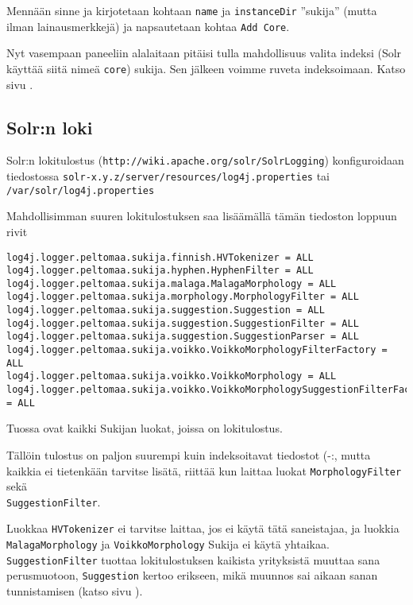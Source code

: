 \documentclass[12pt,a4paper]{scrartcl}
\begin{document}
Mennään sinne ja kirjotetaan kohtaan \verb=name= ja \verb=instanceDir=
''sukija'' (mutta ilman lainausmerkkejä) ja napsautetaan kohtaa
\verb=Add Core=.

Nyt vasempaan paneeliin alalaitaan pitäisi tulla mahdollisuus valita
indeksi (Solr käyttää siitä nimeä \verb=core=) sukija. Sen jälkeen
voimme ruveta indeksoimaan. Katso sivu .


\subsection*{Solr:n loki}

Solr:n lokitulostus (\verb=http://wiki.apache.org/solr/SolrLogging=)
konfiguroidaan tiedostossa
\verb=solr-x.y.z/server/resources/log4j.properties= tai \\
\verb=/var/solr/log4j.properties=

Mahdollisimman suuren lokitulostuksen saa lisäämällä tämän tiedoston
loppuun rivit


{\footnotesize
\begin{verbatim}
log4j.logger.peltomaa.sukija.finnish.HVTokenizer = ALL
log4j.logger.peltomaa.sukija.hyphen.HyphenFilter = ALL
log4j.logger.peltomaa.sukija.malaga.MalagaMorphology = ALL
log4j.logger.peltomaa.sukija.morphology.MorphologyFilter = ALL
log4j.logger.peltomaa.sukija.suggestion.Suggestion = ALL
log4j.logger.peltomaa.sukija.suggestion.SuggestionFilter = ALL
log4j.logger.peltomaa.sukija.suggestion.SuggestionParser = ALL
log4j.logger.peltomaa.sukija.voikko.VoikkoMorphologyFilterFactory = ALL
log4j.logger.peltomaa.sukija.voikko.VoikkoMorphology = ALL
log4j.logger.peltomaa.sukija.voikko.VoikkoMorphologySuggestionFilterFactory = ALL
\end{verbatim}
}

Tuossa ovat kaikki Sukijan luokat, joissa on lokitulostus.

Tällöin tulostus on paljon suurempi kuin indeksoitavat tiedostot (-:,
mutta kaikkia ei tietenkään tarvitse lisätä, riittää kun laittaa
luokat \verb=MorphologyFilter= sekä \\
\verb=SuggestionFilter=.

Luokkaa \verb=HVTokenizer= ei tarvitse laittaa, jos ei käytä tätä
saneistajaa, ja luokkia \\
\verb=MalagaMorphology= ja \verb=VoikkoMorphology= Sukija ei käytä
yhtaikaa. \verb=SuggestionFilter= tuottaa lokitulostuksen kaikista
yrityksistä muuttaa sana perusmuotoon, \verb=Suggestion= kertoo
erikseen, mikä muunnos sai aikaan sanan tunnistamisen (katso sivu
).
\end{document}
